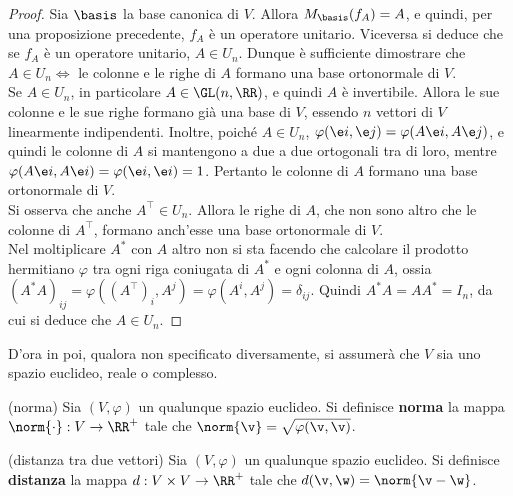 \documentclass[11pt]{article}
\begin{document}
	\begin{proof}
		Sia $\basis$ la base canonica di $V$. Allora $M_\basis(f_A) = A$, e quindi, per una proposizione
		precedente, $f_A$ è un operatore unitario. Viceversa si deduce che se $f_A$ è un operatore unitario,
		$A \in U_n$. Dunque è sufficiente dimostrare che $A \in U_n \iff$ le colonne e le righe di $A$ formano una
		base ortonormale di $V$. \\
		
		\rightproof Se $A \in U_n$, in particolare $A \in \GL(n, \RR)$, e quindi $A$ è invertibile. Allora le
		sue colonne e le sue righe formano già una base di $V$, essendo $n$ vettori di $V$ linearmente indipendenti.
		Inoltre, poiché $A \in U_n$, $\varphi(\e i, \e j) = \varphi(A \e i, A \e j)$, e quindi le colonne di $A$ si mantengono a due a due ortogonali tra di loro, mentre $\varphi(A \e i, A \e i) = \varphi(\e i, \e i) = 1$.
		Pertanto le colonne di $A$ formano una base ortonormale di $V$. \\
		
		Si osserva che anche $A^\top \in U_n$. Allora le righe di $A$, che non sono altro che
		le colonne di $A^\top$, formano anch'esse una base ortonormale di $V$. \\
		
		\leftproof Nel moltiplicare $A^*$ con $A$ altro non si sta facendo che calcolare il prodotto
		hermitiano $\varphi$ tra ogni riga coniugata di $A^*$ e ogni colonna di $A$, ossia $(A^* A)_{ij} = \varphi((A^\top)_i, A^j) = \varphi(A^i, A^j) = \delta_{ij}$.
		Quindi $A^* A = A A^* = I_n$, da cui si deduce che $A \in U_n$.
	\end{proof}

	\hr
	
	\begin{note}
		D'ora in poi, qualora non specificato diversamente, si assumerà che $V$ sia uno spazio
		euclideo, reale o complesso.
	\end{note}
	
	\begin{definition} (norma)
		Sia $(V, \varphi)$ un qualunque spazio euclideo. Si definisce \textbf{norma} la mappa
		$\norm{\cdot} : V \to \RR^+$ tale che $\norm{\v} = \sqrt{\varphi(\v, \v)}$.
	\end{definition}

	\begin{definition} (distanza tra due vettori)
		Sia $(V, \varphi)$ un qualunque spazio euclideo. Si definisce \textbf{distanza} la mappa
		$d : V \times V \to \RR^+$ tale che $d(\v, \w) = \norm{\v - \w}$.
	\end{definition}
\end{document}
